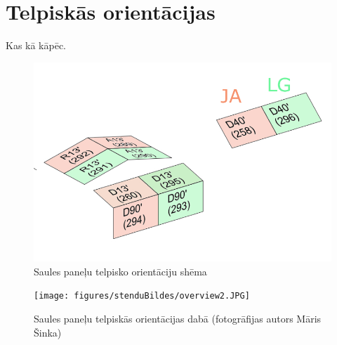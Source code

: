 \section{Telpiskās orientācijas}

Kas kā kāpēc. \\

\begin{figure}[h]
    \centering
    \includegraphics[width=0.7\linewidth]{figures/misc/uzstadijumaShema.jpg}
    \caption{Saules paneļu telpisko orientāciju shēma}
    \label{fig:paneli}
\end{figure}

\begin{figure}[h]
    \centering
    \texttt{[image: figures/stenduBildes/overview2.JPG]}
    \caption{Saules paneļu telpiskās orientācijas dabā (fotogrāfijas autors Māris Šinka)}
    \label{fig:paneli}
\end{figure}